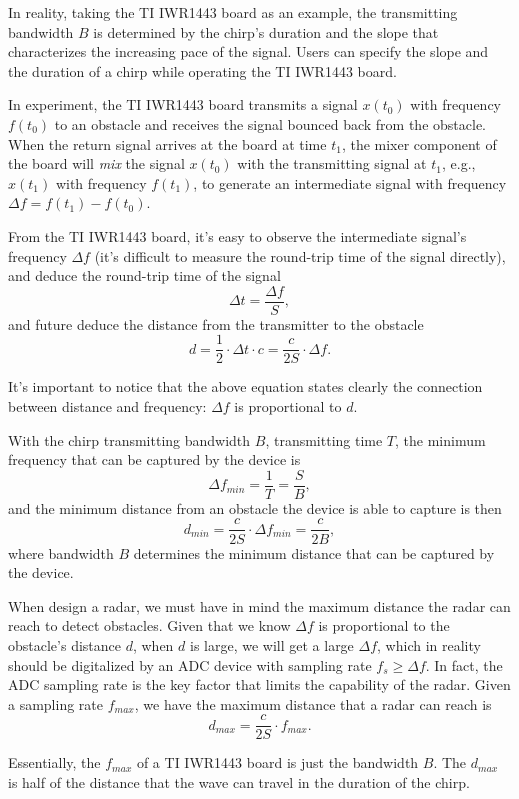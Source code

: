 \documentclass[11pt, oneside]{article}   	%
\begin{document}
In reality, taking the TI IWR1443 board as an example, the transmitting bandwidth $B$ is determined by the chirp's duration and the slope that characterizes the increasing pace of the signal. Users can specify the slope and the duration of a chirp while operating the TI IWR1443 board.

In experiment, the TI IWR1443 board transmits a signal $x(t_0)$ with frequency $f(t_0)$ to an obstacle and receives the signal bounced back from the obstacle. When the return signal arrives at the board at time $t_1$, the mixer component of the board will \emph{mix} the signal $x(t_0)$ with the transmitting signal at $t_1$, e.g., $x(t_1)$ with frequency $f(t_1)$, to generate an intermediate signal with frequency $\Delta f = f(t_1) - f(t_0)$. 

From the TI IWR1443 board, it's easy to observe the intermediate signal's frequency $\Delta f$ (it's difficult to measure the round-trip time of the signal directly), and deduce the round-trip time of the signal 
$$\Delta t = \frac{\Delta f}{S},$$
and future deduce the distance from the transmitter to the obstacle 
$$d = \frac{1}{2}\cdot \Delta t \cdot c = \frac{c}{2S}\cdot \Delta f.$$

It's important to notice that the above equation states clearly the connection between distance and frequency: $\Delta f$ is proportional to $d$.

With the chirp transmitting bandwidth $B$, transmitting time $T$, the minimum frequency that can be captured by the device is 
$$\Delta f_{min} = \frac{1}{T} = \frac{S}{B}, $$ and the minimum distance from an obstacle the device is able to capture is then 
$$d_{min} = \frac{c}{2S}\cdot \Delta f_{min} = \frac{c}{2B},$$
where bandwidth $B$ determines the minimum distance that can be captured by the device. 

When design a radar, we must have in mind the maximum distance the radar can reach to detect obstacles. Given that we know $\Delta f$ is proportional to the obstacle's distance $d$, when $d$ is large, we will get a large $\Delta f$,  which in reality should be digitalized by an ADC device with sampling rate $f_s \ge \Delta f$. In fact, the ADC sampling rate is the key factor that limits the capability of the radar. Given a sampling rate $f_{max}$, we have the maximum distance that a radar can reach is 
$$d_{max} = \frac{c}{2S}\cdot  f_{max}.$$

Essentially, the $f_{max}$ of a TI IWR1443 board is just the bandwidth $B$. The $d_{max}$ is half of the distance that the wave can travel in the duration of the chirp.
\end{document}
